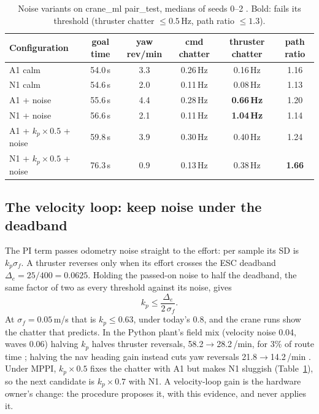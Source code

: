 \begin{table}[h]
\centering\small
\begin{tabular}{@{}lccccc@{}}
\toprule
Configuration & goal time & yaw rev/min & cmd chatter & thruster chatter & path ratio \\
\midrule
A1 calm          & 54.0\,s & 3.3 & 0.26\,Hz & 0.16\,Hz & 1.16 \\
N1 calm          & 54.6\,s & 2.0 & 0.11\,Hz & 0.08\,Hz & 1.13 \\
A1 + noise       & 55.6\,s & 4.4 & 0.28\,Hz & \textbf{0.66\,Hz} & 1.20 \\
N1 + noise       & 56.6\,s & 2.1 & 0.11\,Hz & \textbf{1.04\,Hz} & 1.14 \\
A1 + $k_p{\times}0.5$ + noise & 59.8\,s & 3.9 & 0.30\,Hz & 0.40\,Hz & 1.24 \\
N1 + $k_p{\times}0.5$ + noise & 76.3\,s & 0.9 & 0.13\,Hz & 0.38\,Hz & \textbf{1.66} \\
\bottomrule
\end{tabular}
\caption{Noise variants on crane\_ml pair\_test, medians of seeds 0--2 .
Bold: fails its threshold (thruster chatter $\le 0.5$\,Hz, path ratio $\le 1.3$).}
\label{tab:noise}
\end{table}

\subsection{The velocity loop: keep noise under the deadband}
The PI term passes odometry noise straight to the effort: per sample its SD is $k_p\sigma_f$.
A thruster reverses only when its effort crosses the ESC deadband $\Delta_e = 25/400 = 0.0625$.
Holding the passed-on noise to half the deadband, the same factor of two as every threshold
against its noise, gives
\[
  k_p \le \frac{\Delta_e}{2\,\sigma_f}.
\]
At $\sigma_f = 0.05$\,m/s that is $k_p \le 0.63$, under today's 0.8, and the crane runs show the
chatter that predicts. In the Python plant's field mix (velocity noise 0.04, waves 0.06) halving
$k_p$ halves thruster reversals, 58.2$\to$28.2\,/min, for 3\% of route time
; halving the nav heading gain instead cuts yaw reversals
21.8$\to$14.2\,/min . Under MPPI, $k_p\times0.5$ fixes the chatter with A1 but
makes N1 sluggish (Table~\ref{tab:noise}), so the next candidate is $k_p\times0.7$ with N1. A
velocity-loop gain is the hardware owner's change: the procedure proposes it, with this
evidence, and never applies it.


